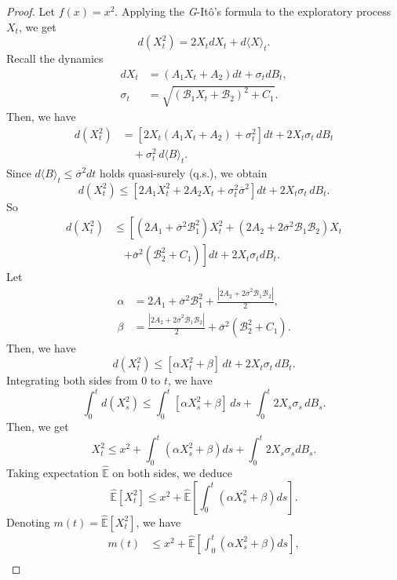 \documentclass[onecolumn, journal]{IEEEtran} %
\begin{document}
\begin{proof}
		Let $f(x) = x^2$. Applying the \textit{G}-Itô's formula to the exploratory process $X_t$, we get
		\[
		d(X_t^2) = 2X_t dX_t + d\langle X \rangle_t.
		\]
		Recall the dynamics
		\[
		\begin{aligned}
			dX_t &= (A_1 X_t + A_2)dt + \sigma_t dB_t, \\
			\sigma_t &= \sqrt{(\mathcal{B}_1 X_t + \mathcal{B}_2)^2 + C_1}.
		\end{aligned}
		\]
		Then, we have
		\[
		\begin{aligned}
			d(X_t^2) &= \left[ 2X_t(A_1 X_t + A_2) + \sigma_t^2 \right] dt + 2X_t \sigma_t \, dB_t \\
			&\quad + \sigma_t^2 \, d\langle B \rangle_t.
		\end{aligned}
		\]
		Since $d\langle B \rangle_t \leq \overline{\sigma}^2 dt$ holds quasi-surely (q.s.), we obtain
		\[
		d(X_t^2) \leq \left[2A_1 X_t^2 + 2A_2 X_t + \sigma_t^2  \overline{\sigma}^2\right] dt + 2X_t \sigma_t\,dB_t.
		\]
		So
		\begin{align*}
			d(X_t^2) &\leq \left[ (2A_1 + \overline{\sigma}^2 \mathcal{B}_1^2) X_t^2 + (2A_2 + 2\overline{\sigma}^2 \mathcal{B}_1 \mathcal{B}_2) X_t \right. \\
			&\quad \left. + \overline{\sigma}^2(\mathcal{B}_2^2 + C_1) \right] dt + 2X_t \sigma_t dB_t.
		\end{align*}
		Let
		\begin{align}
			\alpha &= 2A_1 + \overline{\sigma}^2 \mathcal{B}_1^2 + \frac{|2A_2 + 2\overline{\sigma}^2 \mathcal{B}_1 \mathcal{B}_2|}{2}, \label{A.1}\tag{A.1}\\
			\beta  &= \frac{|2A_2 + 2\overline{\sigma}^2 \mathcal{B}_1 \mathcal{B}_2|}{2} +\overline{\sigma}^2 (\mathcal{B}_2^2 + C_1). \nonumber
		\end{align}
		Then, we have
		\[
		d(X_t^2) \leq [\alpha X_t^2 + \beta]\, dt + 2X_t \sigma_t\, dB_t.
		\]
		Integrating both sides from 0 to $t$, we have
		\[
		\int_0^t d(X_s^2) \leq \int_0^t [\alpha X_s^2 + \beta]\, ds + \int_0^t 2X_s \sigma_s\, dB_s.
		\]
		Then, we get
		\[
		X_t^2 \leq x^2 + \int_0^t (\alpha X_s^2 + \beta)  ds + \int_0^t 2X_s\sigma_s  dB_s.
		\]
		Taking expectation $\mathbb{\hat{E}}$ on both sides, we deduce
		\[
		\hat{\mathbb{E}}[X_t^2] \leq x^2 + \hat{\mathbb{E}}\left[ \int_0^t (\alpha X_s^2 + \beta) ds \right].
		\]
		Denoting $m(t) = \hat{\mathbb{E}}[X_t^2]$, we have
		\begin{align*}
			m(t) &\leq x^2 + \hat{\mathbb{E}} \left[ \int_0^t (\alpha X_s^2 + \beta)  ds \right], \\

\end{align*}
\end{proof}
\end{document}
